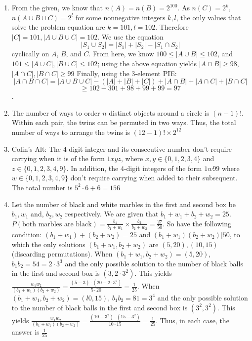 \documentclass{book}
\numberwithin{equation}{section}
\begin{document}
\begin{enumerate}[label={1.\arabic*}]
\item
From the given, we know that $n(A) = n(B) = 2^{100}$. As $n(C) = 2^k$, $n(A
\cup B \cup C) = 2^l$ for some nonnegative integers $k, l$, the only values
that solve the problem equation are $k = 101, l = 102$. Therefore \newline
$|C| = 101,
|A \cup B \cup C| = 102$. We use the equation $$|S_1 \cup S_2| = |S_1| + |S_2| 
- |S_1 \cap S_2|$$ cyclically on $A$, $B$, and $C$. From here, we know $100 
\leq |A \cup B| \leq 102$, and $101 \leq |A \cup C|, |B \cup C| \leq 102$;
using the above equation yields $|A \cap B| \geq 98$, $|A \cap C|, |B \cap
C| \geq 99$
Finally, using the 3-element PIE: $$|A \cap B \cap C| = |A \cup B \cup C| -
(|A| + |B| + |C|) + |A \cap B| + |A \cap C| + |B \cap C|$$ 
$$\geq 102 - 301 + 98 + 99 + 99 = 97$$.

\item
The number of ways to order $n$ distinct objects around a circle is
$(n-1)!$. Within each pair, the twins can be permuted in two ways. Thus,
the total number of ways to arrange the twins is $(12-1)! \times 2^{12}$

\item
Colin's Alt: The 4-digit integer and its consecutive number don't require
carrying when it is of the form $1xyz$, where $x, y \in \{0, 1, 2, 3, 4\}$
and $z \in \{0, 1, 2, 3, 4, 9\}$. In addition, the 4-digit integers of the
form $1w99$ where $w \in \{0, 1, 2, 3, 4, 9\}$ don't require carrying when
added to their subsequent. The total number is $5^2 \cdot 6 + 6 = 156$

\item
Let the number of black and white marbles in the first and second box be
$b_1, w_1$ and, $b_2, w_2$ respectively. We are given that $b_1 + w_1 +
b_2 + w_2 = 25$. $P(\text{both marbles are black}) = \frac{b_1}{b_1+w_1}
\times \frac{b_2}{b_2+w_2} = \frac{27}{50}$. So have the following
condition: $(b_1+w_1)+(b_2+w_2)=25$ and $(b_1+w_1)(b_2+w_2)|50$, to
which the only solutions $(b_1+w_1,b_2+w_2)$ are $(5,20), (10,15)$
(discarding permutations). When $(b_1+w_1,b_2+w_2)=(5,20)$,
$b_1b_2=54=2\cdot3^3$ and the only possible solution to the number of
black balls in the first and second box is $(3,2\cdot3^2)$. This yields
$\frac{w_1w_2}{(b_1+w_1)(b_2+w_2)}=\frac{(5-3)\cdot(20-2\cdot3^2)}{5\cdot20}=\frac{1}{25}$.
When $(b_1+w_1,b_2+w_2)=(l0,15)$, $b_1b_2=81=3^4$ and the only possible
solution to the number of black balls in the first and second box is
$(3^2,3^2)$. This yields $\frac{w_1w_2}{(b_1+w_1)(b_2+w_2)} =
\frac{(10-3^2)\cdot(15-3^2)}{10\cdot15} = \frac{1}{25}$. Thus, in each
case, the answer is $\frac{1}{25}$


\end{enumerate}
\end{document}
